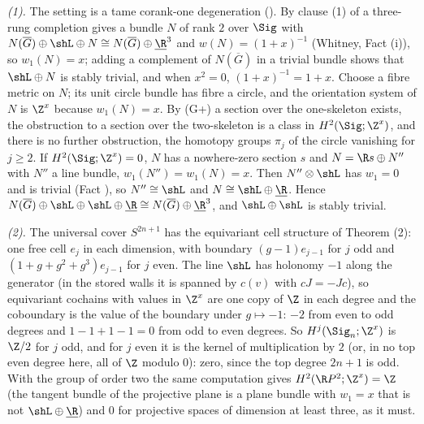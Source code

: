 \emph{(1).} The setting is a tame corank-one degeneration (). By clause (1) of  a three-rung completion gives a bundle $N$ of rank $2$ over $\Sig$ with $N(\overline G) \oplus \shL \oplus N \cong N(\overline G) \oplus \underline{\R}^{3}$ and $w(N) = (1 + x)^{-1}$ (Whitney, Fact (i)), so $w_{1}(N) = x$; adding a complement of $N(\overline G)$ in a trivial bundle shows that $\shL \oplus N$ is stably trivial, and when $x^{2} = 0$, $(1 + x)^{-1} = 1 + x$. Choose a fibre metric on $N$; its unit circle bundle has fibre a circle, and the orientation system of $N$ is $\Z^{x}$ because $w_{1}(N) = x$. By (G+) a section over the one-skeleton exists, the obstruction to a section over the two-skeleton is a class in $H^{2}(\Sig; \Z^{x})$, and there is no further obstruction, the homotopy groups $\pi_{j}$ of the circle vanishing for $j \geq 2$. If $H^{2}(\Sig; \Z^{x}) = 0$, $N$ has a nowhere-zero section $s$ and $N = \R s \oplus N''$ with $N''$ a line bundle, $w_{1}(N'') = w_{1}(N) = x$. Then $N'' \otimes \shL$ has $w_{1} = 0$ and is trivial (Fact ), so $N'' \cong \shL$ and $N \cong \shL \oplus \underline{\R}$. Hence $N(\overline G) \oplus \shL \oplus \shL \oplus \underline{\R} \cong N(\overline G) \oplus \underline{\R}^{3}$, and $\shL \oplus \shL$ is stably trivial.

\emph{(2).} The universal cover $S^{2n+1}$ has the equivariant cell structure of Theorem (2): one free cell $e_{j}$ in each dimension, with boundary $(g - 1)e_{j-1}$ for $j$ odd and $(1 + g + g^{2} + g^{3})e_{j-1}$ for $j$ even. The line $\shL$ has holonomy $-1$ along the generator (in the stored walls it is spanned by $c(v)$ with $cJ = -Jc$), so equivariant cochains with values in $\Z^{x}$ are one copy of $\Z$ in each degree and the coboundary is the value of the boundary under $g \mapsto -1$: $-2$ from even to odd degrees and $1 - 1 + 1 - 1 = 0$ from odd to even degrees. So $H^{j}(\Sig_{n}; \Z^{x})$ is $\Z/2$ for $j$ odd, and for $j$ even it is the kernel of multiplication by $2$ (or, in no top even degree here, all of $\Z$ modulo $0$): zero, since the top degree $2n + 1$ is odd. With the group of order two the same computation gives $H^{2}(\R P^{2}; \Z^{x}) = \Z$ (the tangent bundle of the projective plane is a plane bundle with $w_{1} = x$ that is not $\shL \oplus \underline{\R}$) and $0$ for projective spaces of dimension at least three, as it must.


